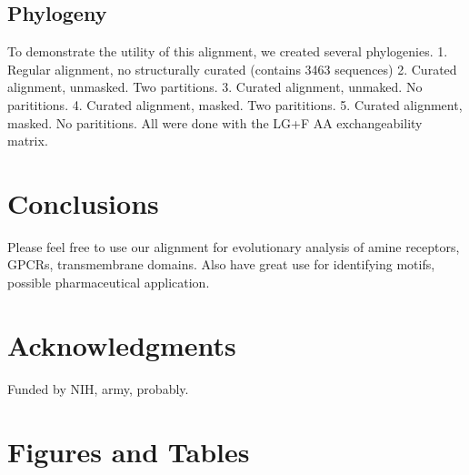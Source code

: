 \documentclass[fleqn,10pt]{wlpeerj}
\begin{document}
\subsection*{Phylogeny}


To demonstrate the utility of this alignment, we created several phylogenies. 
1. Regular alignment, no structurally curated (contains 3463 sequences)
2. Curated alignment, unmasked. Two partitions.
3. Curated alignment, unmaked. No parititions.
4. Curated alignment, masked. Two parititions.
5. Curated alignment, masked. No parititions.
All were done with the LG+F AA exchangeability matrix.

\section*{Conclusions}
Please feel free to use our alignment for evolutionary analysis of amine receptors, GPCRs, transmembrane domains. Also have great use for identifying motifs, possible pharmaceutical application.

















\section*{Acknowledgments}

Funded by NIH, army, probably.

%


\section*{Figures and Tables}
\end{document}
